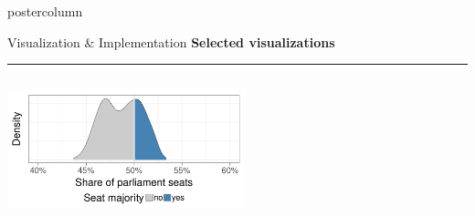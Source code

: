 \documentclass[final,hyperref={pdfpagelabels=false}]{beamer}
\newcommand{\bfBlue}[1]{\textcolor{koaladarkestblue}{\textbf{#1}}}
\begin{document}
\begin{frame}
\begin{columns}
\begin{column}{1\textwidth}
\begin{columns}[T]
\begin{column}{.484\textwidth}
\begin{beamercolorbox}[center,wd=\textwidth]{postercolumn}
\begin{minipage}[T]{.95\textwidth}
\begin{block}{\footnotesize Visualization \& Implementation}
\bfBlue{Selected visualizations}
\\[0.05cm]
\textcolor{LMUlightgray}{\hrule{}}
\vspace{1ex}
\begin{columns}[t]
  \begin{column}{.35\textwidth}
  \begin{center}\centering
  \includegraphics[height=130px]{figures/vis_seatDist}
  \end{center}
  \end{column}

  \hspace{-1.5ex}
  \textcolor{LMUlightgray}{\vrule{}}
  \hspace{1.5ex}


\end{columns}
\end{block}
\end{minipage}
\end{beamercolorbox}
\end{column}
\end{columns}
\end{column}
\end{columns}
\end{frame}
\end{document}
